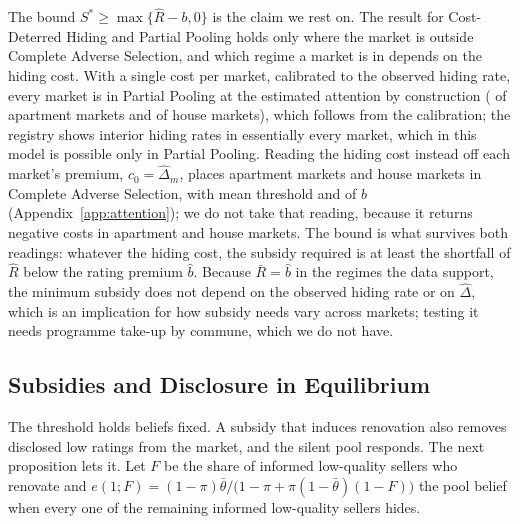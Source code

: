 \documentclass[10pt,letterpaper]{bp-template-concise}
\begin{document}
The bound $S^*\ge\max\{\hat R-b,0\}$ is the claim we rest on. The result for Cost-Deterred Hiding and Partial Pooling holds only where the market is outside Complete Adverse Selection, and which regime a market is in depends on the hiding cost. With a single cost per market, calibrated to the observed hiding rate, every market is in Partial Pooling at the estimated attention by construction (\attScBaseNPpApt{} of \attNMarketsApt{} apartment markets and \attScBaseNPpHouse{} of \attNMarketsHouse{} house markets), which follows from the calibration; the registry shows interior hiding rates in essentially every market, which in this model is possible only in Partial Pooling. Reading the hiding cost instead off each market's premium, $c_0=\hat\Delta_m$, places \attRawNCasApt{} apartment markets and \attRawNCasHouse{} house markets in Complete Adverse Selection, with mean threshold \attRawRbarRatioApt{} and \attRawRbarRatioHouse{} of $b$ (Appendix~\ref{app:attention}); we do not take that reading, because it returns negative costs in \attRawNNegApt{} apartment and \attRawNNegHouse{} house markets. The bound is what survives both readings: whatever the hiding cost, the subsidy required is at least the shortfall of $\hat R$ below the rating premium $\hat b$. Because $\bar R=\hat b$ in the regimes the data support, the minimum subsidy does not depend on the observed hiding rate or on $\hat\Delta$, which is an implication for how subsidy needs vary across markets; testing it needs programme take-up by commune, which we do not have.

\subsection{Subsidies and Disclosure in Equilibrium}
\label{ss:policy_ge}

The threshold holds beliefs fixed. A subsidy that induces renovation also removes disclosed low ratings from the market, and the silent pool responds. The next proposition lets it. Let $F$ be the share of informed low-quality sellers who renovate and $e(1;F)=(1-\pi)\bar\theta/\big(1-\pi+\pi(1-\bar\theta)(1-F)\big)$ the pool belief when every one of the remaining informed low-quality sellers hides.
\end{document}
